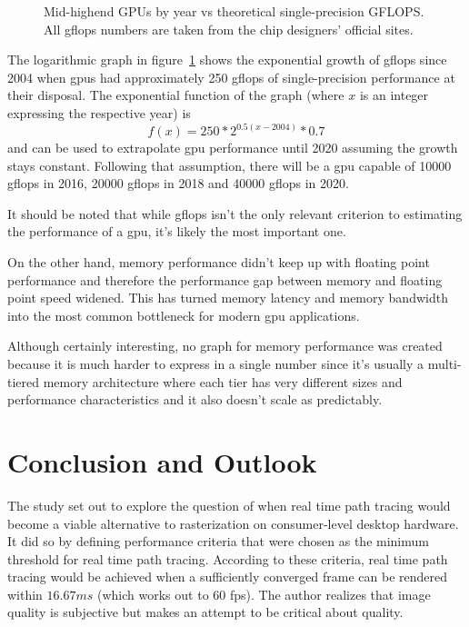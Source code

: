 \documentclass[
  twoside,
  11pt, a4paper,
  footinclude=true,
  headinclude=true,
  cleardoublepage=empty
]{scrreprt}
\begin{document}
\begin{figure}[H]
    \centering
    \caption{Mid-highend GPUs by year vs theoretical single-precision GFLOPS.
    All \ac{gflops} numbers are taken from the chip designers' official sites.}
    \label{fig:gpus-by-year}
\end{figure}

The logarithmic graph in figure~\ref{fig:gpus-by-year} shows the exponential growth of \ac{gflops} since 2004
when \acp{gpu} had approximately 250 \ac{gflops} of single-precision performance at their disposal.
The exponential function of the graph
(where \(x\) is an integer expressing the respective year) is
\[ f(x) = 250 * 2 ^ {0.5 (x-2004)} * 0.7 \]
and can be used to extrapolate \ac{gpu} performance until 2020 assuming the growth stays constant.
Following that assumption, there will be a \ac{gpu} capable of 10000 \ac{gflops} in 2016, 20000
\ac{gflops} in 2018 and 40000 \ac{gflops} in 2020.

It should be noted that while \ac{gflops} isn't the only relevant criterion to estimating the
performance of a \ac{gpu}, it's likely the most important one.

On the other hand, memory performance didn't keep up with floating point performance and therefore
the performance gap between memory and floating point speed widened. This has turned memory latency
and memory bandwidth into the most common bottleneck for modern \ac{gpu} applications.

Although certainly interesting, no graph for memory performance was created because
it is much harder to express in a single number since it's usually
a multi-tiered memory architecture where each tier has very different sizes
and performance characteristics and it also doesn't scale as predictably.

\chapter{Conclusion and Outlook}
The study set out to explore the question of when real time path tracing would become
a viable alternative to rasterization on consumer-level desktop hardware. It did so by defining
performance criteria that were chosen as the minimum threshold for real time path tracing.
According to these criteria, real time path tracing would be achieved when a sufficiently converged
frame can be rendered within \(16.67ms\) (which works out to 60 \ac{fps}). The author realizes that
image quality is subjective but makes an attempt to be critical about quality.
\end{document}
